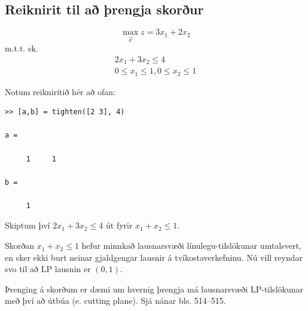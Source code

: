 \subsection{Reiknirit til að þrengja skorður}

\begin{daemi}$$\max_{\vec{x}} z = 3x_1 + 2 x_2$$
m.t.t. sk.
\begin{eqnarray*}
2x_1 + 3x_2  \le  4 \\
0\le x_1\le 1, 0\le x_2 \le 1
\end{eqnarray*}
\end{daemi}
\begin{lausn}Notum reikniritið hér að ofan:
\begin{lstlisting}
>> [a,b] = tighten([2 3], 4)

a =

     1     1

b =

     1
\end{lstlisting}
Skiptum því $2x_1 + 3x_2  \le  4$ út fyrir $x_1+x_2 \le 1$.

\begin{aths}Skorðan $x_1+x_2 \le 1$ hefur minnkað lausnarsvæði línulegu-tilslökunar umtalsvert, en sker ekki burt neinar gjaldgengar lausnir á tvíkostaverkefninu. Nú vill reyndar svo til að LP lausnin er $(0,1)$. 
\end{aths}

\end{lausn}

Þrenging á skorðum er dæmi um hvernig þrengja má lausnarsvæði LP-tilslökunar með því að útbúa  (e. cutting plane). Sjá nánar bls. 514--515.

